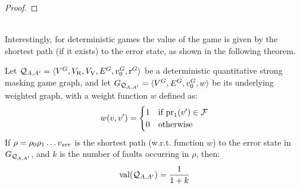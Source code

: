 \begin{proof}
\end{proof} \\

	Interestingly, for deterministic games the value of the game is given by the shortest path (if it exists) to the error state, as shown in the following theorem.
\begin{thm}\label{theorem:det-games} Let  $\mathcal{Q}_{A, A'} = \langle V^G, V_{\mathrm{R}},V_{\mathrm{V}}, E^G, v_0^G, \operatorname{r}^G \rangle$ be a deterministic 
quantitative strong masking game graph,
and let  $G_{\mathcal{Q}_{A, A'}} = \langle V^G,  E^G, v_0^G, w \rangle$ be its underlying weighted graph, with a weight function $w$ 
defined as:
\[
w(v, v') =
\begin{cases} 1 & \text{if $\operatorname{pr}_{1}(v') \in \mathcal{F}$} \\
		      0 & \text{otherwise}	 
\end{cases}
\]
	If $\rho = \rho_0 \rho_1  \dots v_{\mathit{err}}$ is the shortest path (w.r.t. function $w$)
to the error state in $G_{\mathcal{Q}_{A, A'}}$, and $k$ is the number of faults occurring in $\rho$, then: 
\[
	\operatorname{val}(\mathcal{Q}_{A, A'}) = \frac{1}{1+k}
\]
\end{thm}

